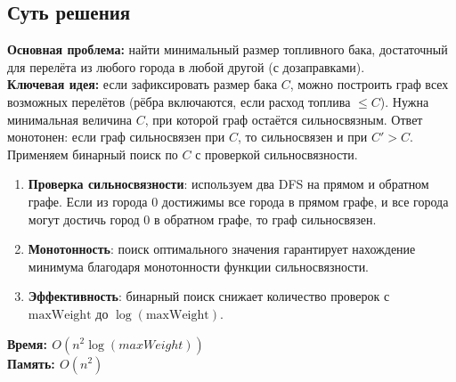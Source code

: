 \documentclass[a4paper,12pt]{article}
\begin{document}
    \subsection*{Суть решения}
    \textbf{Основная проблема:} найти минимальный размер топливного бака, достаточный для перелёта из любого города в любой другой (с дозаправками).\\
    \textbf{Ключевая идея:} если зафиксировать размер бака $C$, можно построить граф всех возможных перелётов (рёбра включаются, если расход топлива $\leq C$). Нужна минимальная величина $C$, при которой граф остаётся сильносвязным. Ответ монотонен: если граф сильносвязен при $C$, то сильносвязен и при $C' > C$. Применяем бинарный поиск по $C$ с проверкой сильносвязности.\\
    \begin{enumerate}
        \item \textbf{Проверка сильносвязности}: используем два DFS на прямом и обратном графе. Если из города 0 достижимы все города в прямом графе, и все города могут достичь город 0 в обратном графе, то граф сильносвязен.
        \item \textbf{Монотонность}: поиск оптимального значения гарантирует нахождение минимума благодаря монотонности функции сильносвязности.
        \item \textbf{Эффективность}: бинарный поиск снижает количество проверок с $\text{maxWeight}$ до $\log(\text{maxWeight})$.
    \end{enumerate}
    \textbf{Время: $O(n^2 \log(maxWeight))$}\\
    \textbf{Память: $O(n^2)$}
\end{document}
